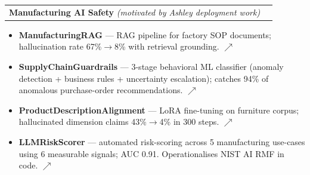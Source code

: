 \documentclass[letterpaper,11pt]{article}
\makeatletter
\newcommand{\resumeItem}[1]{
  \item\small{#1 \vspace{-2pt}}
}
\newcommand{\resumeProjectHeading}[2]{
  \item
    \begin{tabular*}{0.97\textwidth}{l@{\extracolsep{\fill}}r}
      \small#1 & #2 \\
    \end{tabular*}\vspace{-7pt}
}
\newcommand{\resumeItemListStart}{\begin{itemize}}
\newcommand{\resumeItemListEnd}{\end{itemize}\vspace{-5pt}}
\makeatother
\begin{document}
  \resumeProjectHeading
    {\textbf{Manufacturing AI Safety} \emph{(motivated by Ashley deployment work)}}{}
    \resumeItemListStart
      \resumeItem{\textbf{ManufacturingRAG} — RAG pipeline for factory SOP
        documents; hallucination rate 67\%$\to$8\% with retrieval grounding.
        \href{https://github.com/ajaykumarsoma/ManufacturingRAG}{$\nearrow$}}
      \resumeItem{\textbf{SupplyChainGuardrails} — 3-stage behavioral ML
        classifier (anomaly detection + business rules + uncertainty
        escalation); catches 94\% of anomalous purchase-order recommendations.
        \href{https://github.com/ajaykumarsoma/SupplyChainGuardrails}{$\nearrow$}}
      \resumeItem{\textbf{ProductDescriptionAlignment} — LoRA fine-tuning on
        furniture corpus; hallucinated dimension claims 43\%$\to$4\% in 300
        steps.
        \href{https://github.com/ajaykumarsoma/ProductDescriptionAlignment}{$\nearrow$}}
      \resumeItem{\textbf{LLMRiskScorer} — automated risk-scoring across
        5 manufacturing use-cases using 6 measurable signals; AUC 0.91.
        Operationalises NIST AI RMF in code.
        \href{https://github.com/ajaykumarsoma/LLMRiskScorer}{$\nearrow$}}
    \resumeItemListEnd
\end{document}

